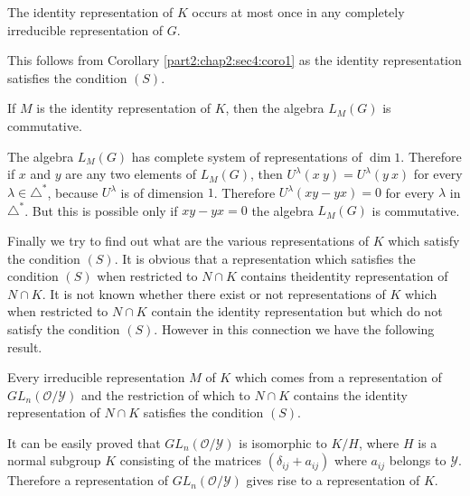 \begin{corollary}\label{part2:chap2:sec4:coro2}%
  The identity representation of $K$ occurs at most once in any
  completely irreducible representation of $G$. 
\end{corollary}

This follows from Corollary \ref{part2:chap2:sec4:coro1} as the
identity representation satisfies the condition $(S)$. 

\begin{corollary}\label{part2:chap2:sec4:coro3}%
  If $M$ is the identity representation of $K$, then the algebra
  $L_M(G)$ is commutative. 
\end{corollary}

The algebra $L_M(G)$ has complete system of representations of $\dim
1$. Therefore if $x$ and $y$ are any two elements of $L_M(G)$, then
$U^\lambda(x~y) = U^\lambda(y ~x)$ for every $\lambda\in \triangle^*$,
because $U^\lambda$ is of dimension $1$. Therefore $U^\lambda(xy - yx)
= 0$ for every $\lambda$ in $\triangle^*$. But this is possible only
if $xy - yx = 0 $ \iec  the algebra $L_M(G)$ is commutative. 

 Finally we try to find out what are the various representations of
 $K$ which satisfy the condition $(S)$. It is obvious that a
 representation which satisfies the condition $(S)$ when restricted to
 $N \cap K$ contains the\pageoriginale identity representation of $N \cap K$. It is
 not known whether there exist or not representations of $K$ which
 when restricted to $N \cap K$ contain the identity representation but
 which do not satisfy the condition $(S)$. However in this connection
 we have the following result. 
 
\begin{theorem}\label{part2:chap2:sec4:thm4}%
   Every irreducible representation $M$ of $K$ which comes from a
   representation of $GL_n(\mathscr{O} /\mathscr{Y})$ and the
   restriction of which to $N \cap K$ contains the identity
   representation of $N\cap K$ satisfies the condition $(S)$. 
\end{theorem} 
 
 It can be easily proved that $GL_n(\mathscr{O}/\mathscr{Y})$ is
 isomorphic to $K/H$, where $H$ is a normal subgroup $K$ consisting of
 the matrices $(\delta_{ij}+a_{ij})$ where $a_{ij}$ belongs to
 $\mathscr{Y}$. Therefore a representation of
 $GL_n(\mathscr{O}/\mathscr{Y})$ gives rise to a representation of
 $K$. 

